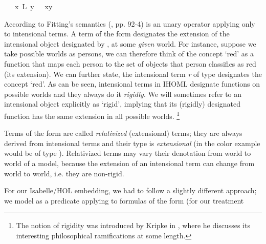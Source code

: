 \begin{isabellebody}
\ \ \ {\isachardoublequoteopen}x\ \isactrlbold {\isasymapprox}\isactrlsup L\ y\ {\isasymequiv}\ \isactrlbold {\isasymforall}{\isasymphi}{\isachardot}\ {\isasymphi}{\isacharparenleft}x{\isacharparenright}\isactrlbold {\isasymrightarrow}{\isasymphi}{\isacharparenleft}y{\isacharparenright}{\isachardoublequoteclose}%
\isamarkuptrue%
%
\begin{isamarkuptext}%
According to Fitting's semantics (\cite{Fitting}, pp. 92-4) \isa{{\isasymdown}} is an unary operator applying only to 
 intensional terms. A term of the form \isa{{\isasymdown}{\isasymalpha}} designates the extension of the intensional object designated by 
 \isa{{\isasymalpha}}, at some \emph{given} world. For instance, suppose we take possible worlds as persons,
 we can therefore think of the concept `red' as a function that maps each person to the set of objects that person
 classifies as red (its extension). We can further state, the intensional term \emph{r} of type \isa{{\isasymup}{\isasymlangle}{\isasymzero}{\isasymrangle}} designates the concept `red'.
 As can be seen, intensional terms in IHOML designate functions on possible worlds and they always do it \emph{rigidly}. 
 We will sometimes refer to an intensional object explicitly as `rigid', implying that its (rigidly) designated function has
 the same extension in all possible worlds. \footnote{The notion of rigidity was introduced by Kripke in \cite{kripke1980},
 where he discusses its interesting philosophical ramifications at some length.}%
\end{isamarkuptext}\isamarkuptrue%
%
\begin{isamarkuptext}%
Terms of the form \isa{{\isasymdown}{\isasymalpha}} are called \emph{relativized} (extensional) terms; they are always derived
from intensional terms and their type is \emph{extensional} (in the color example  would be of type \isa{{\isasymlangle}{\isasymzero}{\isasymrangle}}).
Relativized terms may vary their denotation from world to world of a model, because the extension of an intensional term can change
from world to world, i.e. they are non-rigid.%
\end{isamarkuptext}\isamarkuptrue%
%
\begin{isamarkuptext}%
For our Isabelle/HOL embedding, we had to follow a slightly different approach; we model \isa{{\isasymdown}}
as a predicate applying to formulas of the form  (for our treatment

\end{isamarkuptext}
\end{isabellebody}
